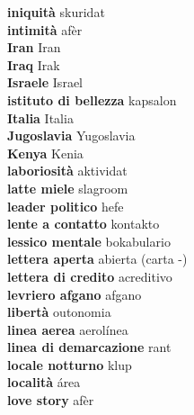 \textbf{ iniquità  } skuridat \\
\textbf{ intimità  } afèr \\
\textbf{ Iran  } Iran \\
\textbf{ Iraq  } Irak \\
\textbf{ Israele  } Israel \\
\textbf{ istituto di bellezza  } kapsalon \\
\textbf{ Italia  } Italia \\
\textbf{ Jugoslavia  } Yugoslavia \\
\textbf{ Kenya  } Kenia \\
\textbf{ laboriosità  } aktividat \\
\textbf{ latte miele  } slagroom \\
\textbf{ leader politico  } hefe \\
\textbf{ lente a contatto  } kontakto \\
\textbf{ lessico mentale  } bokabulario \\
\textbf{ lettera aperta  } abierta (carta -) \\
\textbf{ lettera di credito  } acreditivo \\
\textbf{ levriero afgano  } afgano \\
\textbf{ libertà  } outonomia \\
\textbf{ linea aerea  } aerolínea \\
\textbf{ linea di demarcazione  } rant \\
\textbf{ locale notturno  } klup \\
\textbf{ località  } área \\
\textbf{ love story  } afèr \\
